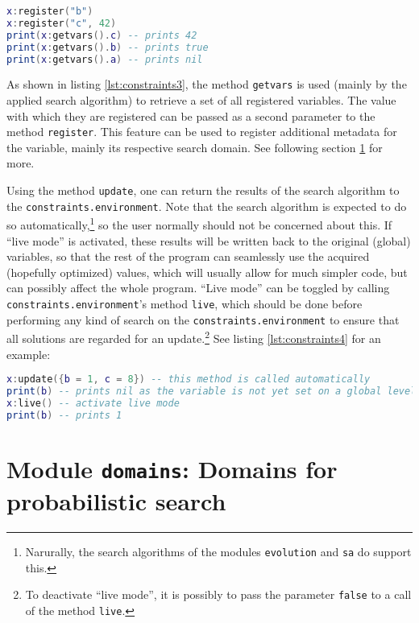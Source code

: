 \begin{lstlisting}[language=lua, caption={Registering variables (continued from listing \ref{lst:constraints2})}, label=lst:constraints3, name=lst:constraints]
x:register("b")
x:register("c", 42)
print(x:getvars().c) -- prints 42
print(x:getvars().b) -- prints true
print(x:getvars().a) -- prints nil
\end{lstlisting}

As shown in listing \ref{lst:constraints3}, the method \texttt{getvars} is used (mainly by the applied search algorithm) to retrieve a set of all registered variables. The value with which they are registered can be passed as a second parameter to the method \texttt{register}. This feature can be used to register additional metadata for the variable, mainly its respective search domain. See following section \ref{sec:evolution:domains} for more.

Using the method \texttt{update}, one can return the results of the search algorithm to the \texttt{constraints.environment}. Note that the search algorithm is expected to do so automatically,\footnote{Narurally, the search algorithms of the modules \texttt{evolution} and \texttt{sa} do support this.} so the user normally should not be concerned about this. If ``live mode'' is activated, these results will be written back to the original (global) variables, so that the rest of the program can seamlessly use the acquired (hopefully optimized) values, which will usually allow for much simpler code, but can possibly affect the whole program. ``Live mode'' can be toggled by calling \texttt{constraints.environment}'s method \texttt{live}, which should be done before performing any kind of search on the \texttt{constraints.environment} to ensure that all solutions are regarded for an update.\footnote{To deactivate ``live mode'', it is possibly to pass the parameter \texttt{false} to a call of the method \texttt{live}.} See listing \ref{lst:constraints4} for an example:

\begin{lstlisting}[language=lua, caption={Activating live mode (continued from listing \ref{lst:constraints3})}, label=lst:constraints4, name=lst:constraints]
x:update({b = 1, c = 8}) -- this method is called automatically
print(b) -- prints nil as the variable is not yet set on a global level
x:live() -- activate live mode
print(b) -- prints 1

\end{lstlisting}

\section{Module \texttt{domains}: Domains for probabilistic search}
\label{sec:evolution:domains}

